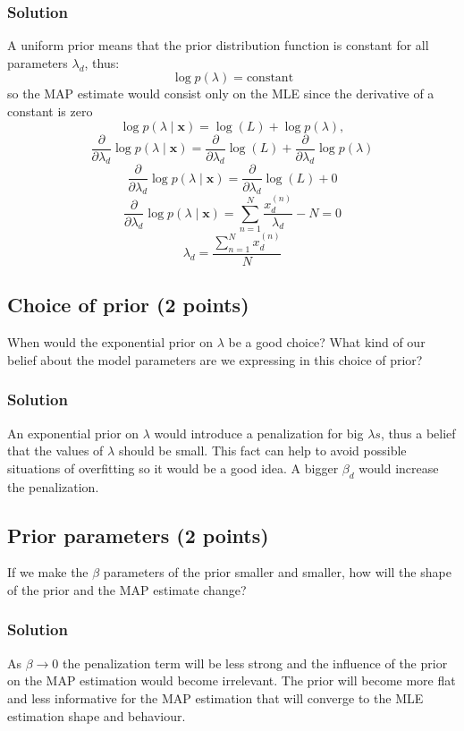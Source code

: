 \documentclass[a4paper,12pt]{article}
\begin{document}
\subsubsection{Solution}
A uniform prior means that the prior distribution function is constant for all parameters $\lambda_d$, thus:
\[
\log p(\lambda) = \text{constant}
\]
so the MAP estimate would consist only on the MLE since the derivative of a constant is zero
\[
\log p(\lambda \mid \mathbf{x}) = \log(L) + \log p(\lambda),
\]
\[
\frac{\partial}{\partial \lambda_d} \log p(\lambda \mid \mathbf{x}) = \frac{\partial}{\partial \lambda_d} \log(L) + \frac{\partial}{\partial \lambda_d} \log p(\lambda)
\]
\[
\frac{\partial}{\partial \lambda_d} \log p(\lambda \mid \mathbf{x}) = \frac{\partial}{\partial \lambda_d} \log(L) + 0
\]
\[
\frac{\partial}{\partial \lambda_d} \log p(\lambda \mid \mathbf{x}) = 
\sum_{n=1}^{N} \frac{x_d^{(n)}}{\lambda_d} - N = 0
\]
\[
\lambda_d = \frac{\sum_{n=1}^{N} x_d^{(n)}}{N}
\]


\subsection{Choice of prior (2 points)}
When would the exponential prior on $\lambda$ be a good choice? What kind of our belief about the model parameters are we expressing in this choice of prior?

\subsubsection{Solution}
An exponential prior on $\lambda$ would introduce a penalization for big $\lambda s$, thus a belief that the values of $\lambda$ should be small. This fact can help to avoid possible situations of overfitting so it would be a good idea. A bigger $\beta_d$ would increase the penalization. 

\subsection{Prior parameters (2 points)}
If we make the $\beta$ parameters of the prior smaller and smaller, how will the shape of the prior and the MAP estimate change?

\subsubsection{Solution}

As $\beta \rightarrow 0$ the penalization term will be less strong and the influence of the prior on the MAP estimation would become irrelevant. The prior will become more flat and less informative for the MAP estimation that will converge to the MLE estimation shape and behaviour.
\end{document}
